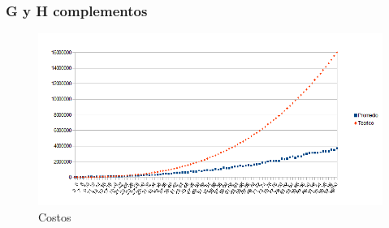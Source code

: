 \subsubsection{G y H complementos}

\begin{figure}[H]
	\centering
	\includegraphics[scale=0.8]{goloso-tiempos-H-complemento.png}
\caption{Costos}
\end{figure}